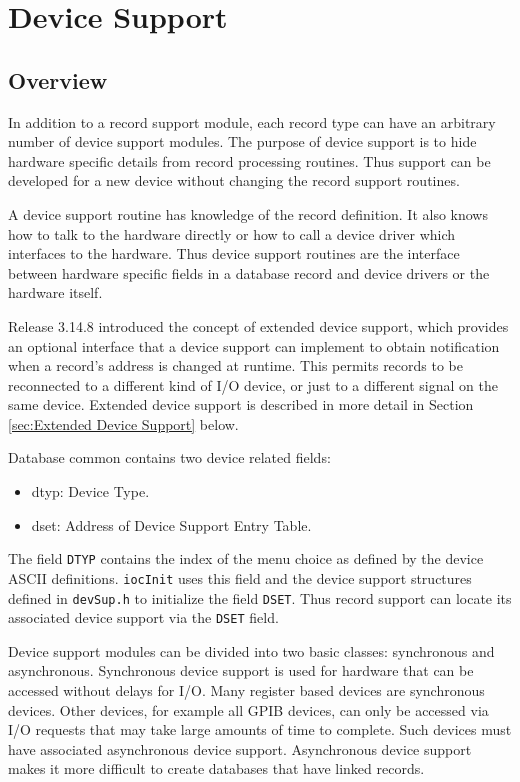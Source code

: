 \chapter{Device Support}

\section{Overview}

In addition to a record support module, each record type can have an arbitrary number of device support modules. The 
purpose of device support is to hide hardware specific details from record processing routines. Thus support can be 
developed for a new device without changing the record support routines.

A device support routine has knowledge of the record definition. It also knows how to talk to the hardware directly or how 
to call a device driver which interfaces to the hardware. Thus device support routines are the interface between hardware 
specific fields in a database record and device drivers or the hardware itself.

Release 3.14.8 introduced the concept of extended device support, which provides an optional interface that a device 
support can implement to obtain notification when a record's address is changed at runtime. This permits records to be 
reconnected to a different kind of I/O device, or just to a different signal on the same device.
Extended device support is described in more detail in Section \ref{sec:Extended Device Support} below.

Database common contains two device related fields:

\begin{itemize}
\item {}dtyp:  Device Type.

\item {}dset:  Address of Device Support Entry Table.

\end{itemize}

The field \verb|DTYP| contains the index of the menu choice as defined by the device ASCII definitions. \verb|iocInit| uses this 
field and the device support structures defined in \verb|devSup.h| to initialize the field \verb|DSET|. Thus record support can locate 
its associated device support via the \verb|DSET| field.

Device support modules can be divided into two basic classes: synchronous and asynchronous. Synchronous device 
support is used for hardware that can be accessed without delays for I/O. Many register based devices are synchronous 
devices. Other devices, for example all GPIB devices, can only be accessed via I/O requests that may take large amounts 
of time to complete. Such devices must have associated asynchronous device support. Asynchronous device support 
makes it more difficult to create databases that have linked records.

